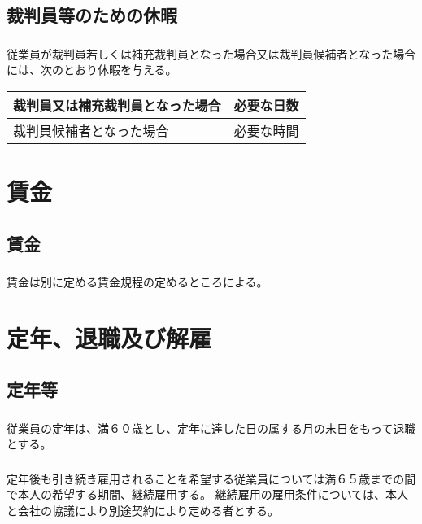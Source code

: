 \documentclass{jsarticle}
\begin{document}
\subsection{裁判員等のための休暇}
\label{就規_条_裁判員等のための休暇}
\subsubsection{}
\label{就規_項_裁判員等のための休暇}
従業員が裁判員若しくは補充裁判員となった場合又は裁判員候補者となった場合には、次のとおり休暇を与える。
  \begin{table}[htb]
    \centering
    \begin{tabular}{|l|c|} \hline
      裁判員又は補充裁判員となった場合 & 必要な日数 \\ \hline
      裁判員候補者となった場合 & 必要な時間 \\ \hline
    \end{tabular}
  \end{table}

\section{賃金}
\label{就規_章_賃金}

\subsection{賃金}
\label{就規_条_賃金}
\subsubsection{}
\label{就規_項_賃金}
賃金は別に定める賃金規程の定めるところによる。

\section{定年、退職及び解雇}
\label{就規_章_定年、退職及び解雇}

\subsection{定年等}
\label{就規_条_定年等}
\subsubsection{}
\label{就規_項_定年}
従業員の定年は、満６０歳とし、定年に達した日の属する月の末日をもって退職とする。
\subsubsection{}
\label{就規_項_定年再雇用}
定年後も引き続き雇用されることを希望する従業員については満６５歳までの間で本人の希望する期間、継続雇用する。
\label{就規_項_定年再雇用の契約}
継続雇用の雇用条件については、本人と会社の協議により別途契約により定める者とする。
\end{document}
